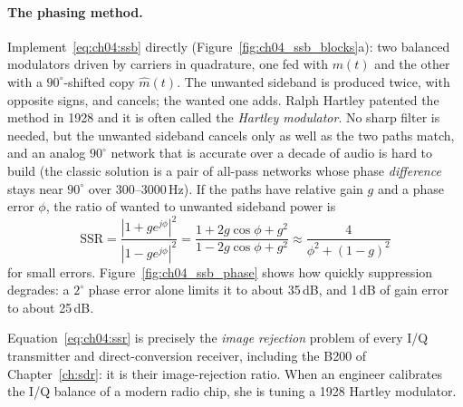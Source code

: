 
\paragraph{The phasing method.} Implement~\eqref{eq:ch04:ssb} directly (Figure~\ref{fig:ch04_ssb_blocks}a):
two balanced modulators driven by carriers in quadrature, one fed with $m(t)$ and the other with a
$90^\circ$-shifted copy $\hat m(t)$. The unwanted sideband is produced twice, with opposite signs, and
cancels; the wanted one adds. Ralph Hartley patented the method in 1928 and it is often called the
\emph{Hartley modulator}. No sharp filter is needed, but the unwanted sideband cancels only as well as
the two paths match, and an analog $90^\circ$ network that is accurate over a decade of audio is hard to
build (the classic solution is a pair of all-pass networks whose phase \emph{difference} stays near
$90^\circ$ over 300--3000\,Hz). If the paths have relative gain $g$ and a phase error $\phi$, the ratio of
wanted to unwanted sideband power is
\begin{equation}
\text{SSR}=\frac{|1+g e^{j\phi}|^2}{|1-ge^{j\phi}|^2}=\frac{1+2g\cos\phi+g^2}{1-2g\cos\phi+g^2}
\approx\frac{4}{\phi^2+(1-g)^2}
\label{eq:ch04:ssr}
\end{equation}
for small errors. Figure~\ref{fig:ch04_ssb_phase} shows how quickly suppression degrades: a $2^\circ$
phase error alone limits it to about 35\,dB, and 1\,dB of gain error to about 25\,dB.


\begin{keyidea}
Equation~\eqref{eq:ch04:ssr} is precisely the \emph{image rejection} problem of every I/Q transmitter
and direct-conversion receiver, including the B200 of Chapter~\ref{ch:sdr}: it is their image-rejection
ratio. When an engineer calibrates the I/Q balance of a modern radio chip, she is tuning a 1928 Hartley
modulator.
\end{keyidea}

